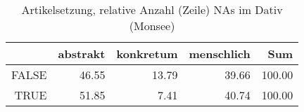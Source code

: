 \begin{table}[ht]
\centering
\begin{tabular}{rrrrr}
  \hline
 & abstrakt & konkretum & menschlich & Sum \\ 
  \hline
FALSE & 46.55 & 13.79 & 39.66 & 100.00 \\ 
  TRUE & 51.85 & 7.41 & 40.74 & 100.00 \\ 
   \hline
\end{tabular}
\caption{Artikelsetzung, relative Anzahl (Zeile) NAs im Dativ (Monsee)} 
\end{table}
